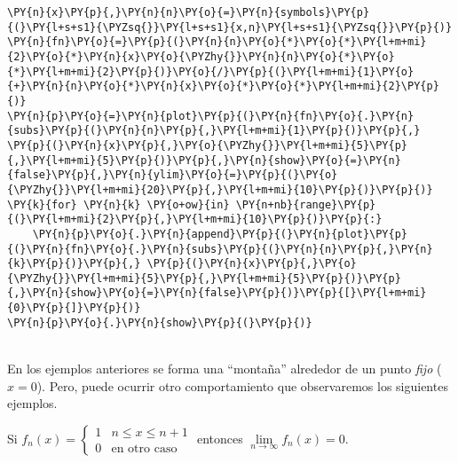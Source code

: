     \begin{tcolorbox}[breakable, size=fbox, boxrule=1pt, pad at break*=1mm,colback=cellbackground, colframe=cellborder]
\begin{Verbatim}[commandchars=\\\{\}]
\PY{n}{x}\PY{p}{,}\PY{n}{n}\PY{o}{=}\PY{n}{symbols}\PY{p}{(}\PY{l+s+s1}{\PYZsq{}}\PY{l+s+s1}{x,n}\PY{l+s+s1}{\PYZsq{}}\PY{p}{)}
\PY{n}{fn}\PY{o}{=}\PY{p}{(}\PY{n}{n}\PY{o}{*}\PY{o}{*}\PY{l+m+mi}{2}\PY{o}{*}\PY{n}{x}\PY{o}{\PYZhy{}}\PY{n}{n}\PY{o}{*}\PY{o}{*}\PY{l+m+mi}{2}\PY{p}{)}\PY{o}{/}\PY{p}{(}\PY{l+m+mi}{1}\PY{o}{+}\PY{n}{n}\PY{o}{*}\PY{n}{x}\PY{o}{*}\PY{o}{*}\PY{l+m+mi}{2}\PY{p}{)}
\PY{n}{p}\PY{o}{=}\PY{n}{plot}\PY{p}{(}\PY{n}{fn}\PY{o}{.}\PY{n}{subs}\PY{p}{(}\PY{n}{n}\PY{p}{,}\PY{l+m+mi}{1}\PY{p}{)}\PY{p}{,} \PY{p}{(}\PY{n}{x}\PY{p}{,}\PY{o}{\PYZhy{}}\PY{l+m+mi}{5}\PY{p}{,}\PY{l+m+mi}{5}\PY{p}{)}\PY{p}{,}\PY{n}{show}\PY{o}{=}\PY{n}{false}\PY{p}{,}\PY{n}{ylim}\PY{o}{=}\PY{p}{(}\PY{o}{\PYZhy{}}\PY{l+m+mi}{20}\PY{p}{,}\PY{l+m+mi}{10}\PY{p}{)}\PY{p}{)}
\PY{k}{for} \PY{n}{k} \PY{o+ow}{in} \PY{n+nb}{range}\PY{p}{(}\PY{l+m+mi}{2}\PY{p}{,}\PY{l+m+mi}{10}\PY{p}{)}\PY{p}{:}
    \PY{n}{p}\PY{o}{.}\PY{n}{append}\PY{p}{(}\PY{n}{plot}\PY{p}{(}\PY{n}{fn}\PY{o}{.}\PY{n}{subs}\PY{p}{(}\PY{n}{n}\PY{p}{,}\PY{n}{k}\PY{p}{)}\PY{p}{,} \PY{p}{(}\PY{n}{x}\PY{p}{,}\PY{o}{\PYZhy{}}\PY{l+m+mi}{5}\PY{p}{,}\PY{l+m+mi}{5}\PY{p}{)}\PY{p}{,}\PY{n}{show}\PY{o}{=}\PY{n}{false}\PY{p}{)}\PY{p}{[}\PY{l+m+mi}{0}\PY{p}{]}\PY{p}{)}
\PY{n}{p}\PY{o}{.}\PY{n}{show}\PY{p}{(}\PY{p}{)}
\end{Verbatim}
\end{tcolorbox}

    \begin{center}
    \end{center}
    { \hspace*{\fill} \\}		
En los ejemplos anteriores se forma una ``montaña'' alrededor de un punto \emph{fijo} ($x=0$). 
Pero, puede ocurrir otro comportamiento que observaremos los siguientes ejemplos.

\begin{ejemplo}{}
Si  $f_n(x)=\left\{
\begin{array}{ll}
1&n\leq x\leq n+1
\\
0&\mbox{en otro caso}
\end{array}
\right.$
entonces $\lim\limits_{n \to \infty} f_n(x)=0$. 
\end{ejemplo} 

